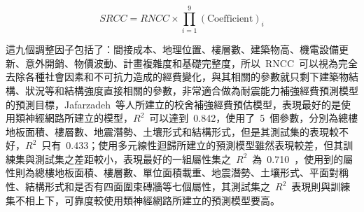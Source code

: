     \begin{equation}SRCC = RNCC \times \prod_{i=1}^9 (\text{Coefficient})_i \end{equation} 

這九個調整因子包括了：間接成本、地理位置、樓層數、建築物高、機電設備更新、意外開銷、物價波動、計畫複雜度和基礎完整度，所以~RNCC~可以視為完全去除各種社會因素和不可抗力造成的經費變化，與其相關的參數就只剩下建築物結構、狀況等和結構強度直接相關的參數，非常適合做為耐震能力補強經費預測模型的預測目標，Jafarzadeh~等人所建立的校舍補強經費預估模型，表現最好的是使用類神經網路所建立的模型，$R^2$~可以達到~0.842，使用了~5~個參數，分別為總樓地板面積、樓層數、地震潛勢、土壤形式和結構形式，但是其測試集的表現較不好，$R^2$~只有~0.433；使用多元線性迴歸所建立的預測模型雖然表現較差，但其訓練集與測試集之差距較小，表現最好的一組屬性集之~$R^2$~為~0.710~，使用到的屬性則為總樓地板面積、樓層數、單位面積載重、地震潛勢、土壤形式、平面對稱性、結構形式和是否有四面圍束磚牆等七個屬性，其測試集之~$R^2$~表現則與訓練集不相上下，可靠度較使用類神經網路所建立的預測模型要高。


